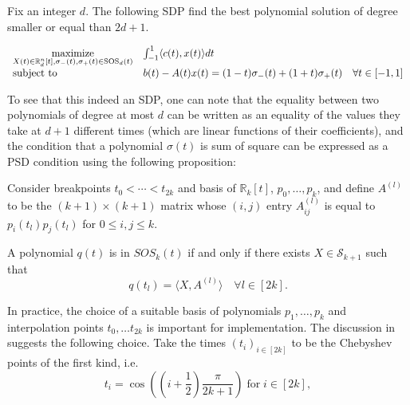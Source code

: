 \documentclass[moor]{informs1}
\begin{document}
\begin{thm}
Fix an integer \(d\). The following SDP find the best polynomial solution of degree smaller or equal than  \(2d+1\).

\begin{equation*}
\label{eq:orglatexenvironment6}
\begin{array}{ll@{}ll}
\underset{X(t) \in \mathbb R^n_d[t], \sigma_-(t), \sigma_+(t) \in \text{SOS}_d(t)}{\text{maximize}} & \int_{-1}^1 \langle c(t), x(t) \rangle dt & \\
\text{subject to}& b(t) - A(t) x(t) = (1-t) \sigma_-(t) + (1+t) \sigma_+(t) \quad \forall t \in [-1, 1]
\end{array}
\end{equation*}
\label{orgspecialblock9}

\end{thm}

To see that this indeed an SDP, one can note that the equality between two polynomials of degree at most \(d\) can be written as an equality of the values they take at \(d+1\) different times (which are linear functions of their coefficients), and the condition that a polynomial \(\sigma(t)\) is sum of square can be expressed as a PSD condition using the following proposition:

\begin{thm}

Consider breakpoints \(t_0< \cdots < t_{2k}\) and basis of \(\mathbb R_k[t]\), \(p_0, \ldots, p_k\), and define \(A^{(l)}\) to be the \((k+1) \times (k+1)\) matrix whose \((i, j)\) entry  \(A_{ij}^{(l)}\) is equal to \(p_i(t_l)p_j(t_l)\) for \(0 \le i, j \le k\).

A polynomial \(q(t)\) is in \(SOS_k(t)\) if and only if there exists \(X \in \mathcal S_{k+1}\) such that
$$q(t_l) = \langle X, A^{(l)} \rangle \quad \forall l \in [2k].$$
\label{orgspecialblock17}

\end{thm}

In practice, the choice of a suitable basis of polynomials \(p_1, \ldots, p_k\) and interpolation points \(t_0, \ldots t_{2k}\) is important for implementation. The discussion in \cite{Parrilo2004} suggests the following choice. Take the times \((t_i)_{i \in [2k]}\) to be the Chebyshev points of the first kind, i.e.
\begin{equation}
\label{eq:orglatexenvironment7}
t_i = \cos((i+\frac12)\frac{\pi}{2k+1}) \; \text{for} \; i\in [2k],
\end{equation}
\end{document}

